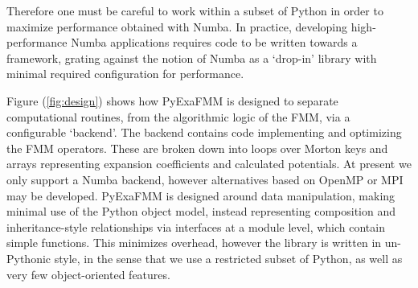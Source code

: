 \documentclass{IEEEcsmag}
\begin{document}
Therefore one must be careful to work within a subset of Python in order to maximize performance obtained with Numba. In practice, developing high-performance Numba applications requires code to be written towards a framework, grating against the notion of Numba as a `drop-in' library with minimal required configuration for performance.

Figure (\ref{fig:design}) shows how PyExaFMM is designed to separate computational routines, from the algorithmic logic of the FMM, via a configurable `backend'. The backend contains code implementing and optimizing the FMM operators. These are broken down into loops over Morton keys and arrays representing expansion coefficients and calculated potentials. At present we only support a Numba backend, however alternatives based on OpenMP or MPI may be developed. PyExaFMM is designed around data manipulation, making minimal use of the Python object model, instead representing composition and inheritance-style relationships via interfaces at a module level, which contain simple functions. This minimizes overhead, however the library is written in un-Pythonic style, in the sense that we use a restricted subset of Python, as well as very few object-oriented features.
\end{document}
